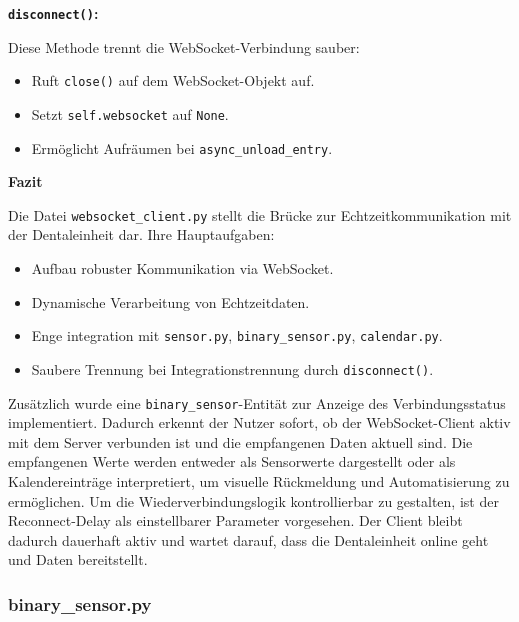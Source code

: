 \vspace{0.5cm}

\textbf{\texttt{disconnect()}:}

Diese Methode trennt die WebSocket-Verbindung sauber:

\begin{itemize}
  \item Ruft \texttt{close()} auf dem WebSocket-Objekt auf.\\
  \item Setzt \texttt{self.websocket} auf \texttt{None}.\\
  \item Ermöglicht Aufräumen bei \texttt{async\_unload\_entry}.
\end{itemize}

\vspace{0.5cm}

\textbf{Fazit}

Die Datei \texttt{websocket\_client.py} stellt die Brücke zur Echtzeitkommunikation mit der Dentaleinheit dar. Ihre Hauptaufgaben:

\begin{itemize}
  \item Aufbau robuster Kommunikation via WebSocket.\\
  \item Dynamische Verarbeitung von Echtzeitdaten.\\
  \item Enge integration mit \texttt{sensor.py}, \texttt{binary\_sensor.py}, \texttt{calendar.py}.\\
  \item Saubere Trennung bei Integrationstrennung durch \texttt{disconnect()}.
\end{itemize}

Zusätzlich wurde eine \texttt{binary\_sensor}-Entität zur Anzeige des Verbindungsstatus implementiert. Dadurch erkennt der Nutzer sofort, ob der WebSocket-Client aktiv mit dem Server verbunden ist und die empfangenen Daten aktuell sind. Die empfangenen Werte werden entweder als Sensorwerte dargestellt oder als Kalendereinträge interpretiert, um visuelle Rückmeldung und Automatisierung zu ermöglichen. Um die Wiederverbindungslogik kontrollierbar zu gestalten, ist der Reconnect-Delay als einstellbarer Parameter vorgesehen. Der Client bleibt dadurch dauerhaft aktiv und wartet darauf, dass die Dentaleinheit online geht und Daten bereitstellt.

\subsubsection{binary\_sensor.py}

